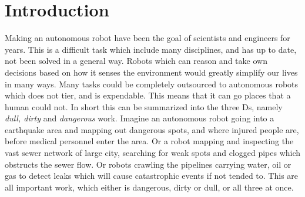 
\chapter{Introduction}
Making an autonomous robot have been the goal of scientists and engineers for years. This
is a difficult task which include many disciplines, and has up to date, not been solved in
a general way. Robots which can reason and take own decisions based on how it senses the
environment would greatly simplify our lives in many ways. Many tasks could be completely
outsourced to autonomous robots which does not tier, and is expendable. This means that it
can go places that a human could not. In short this can be summarized into the three Ds,
namely \emph{dull, dirty} and \emph{dangerous} work. Imagine an autonomous robot going
into a earthquake area and mapping out dangerous spots, and where injured people are,
before medical personnel enter the area. Or a robot mapping and inspecting the vast sewer
network of large city, searching for weak spots and clogged pipes which obstructs the
sewer flow. Or robots crawling the pipelines carrying water, oil or gas to detect leaks
which will cause catastrophic events if not tended to. This are all important work, which
either is dangerous, dirty or dull, or all three at once.


